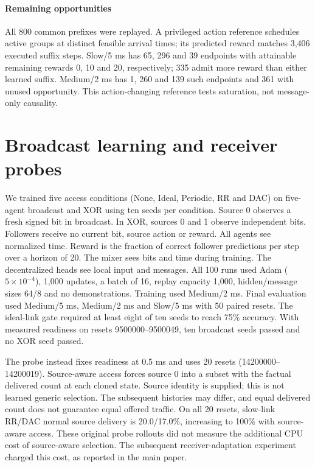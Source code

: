 \documentclass[11pt,a4paper]{article}
\begin{document}
\paragraph{Remaining opportunities}
All 800 common prefixes were replayed. A privileged action reference schedules active groups at distinct feasible arrival times; its predicted reward matches 3,406 executed suffix steps. Slow/5 ms has 65, 296 and 39 endpoints with attainable remaining rewards 0, 10 and 20, respectively; 335 admit more reward than either learned suffix. Medium/2 ms has 1, 260 and 139 such endpoints and 361 with unused opportunity. This action-changing reference tests saturation, not message-only causality.
\FloatBarrier
\section{Broadcast learning and receiver probes}\label{app:probe}
We trained five access conditions (None, Ideal, Periodic, RR and DAC) on five-agent broadcast and XOR using ten seeds per condition. Source 0 observes a fresh signed bit in broadcast. In XOR, sources 0 and 1 observe independent bits. Followers receive no current bit, source action or reward. All agents see normalized time. Reward is the fraction of correct follower predictions per step over a horizon of 20. The mixer sees bits and time during training. The decentralized heads see local input and messages. All 100 runs used Adam ($5\times10^{-4}$), 1,000 updates, a batch of 16, replay capacity 1,000, hidden/message sizes 64/8 and no demonstrations. Training used Medium/2 ms. Final evaluation used Medium/5 ms, Medium/2 ms and Slow/5 ms with 50 paired resets. The ideal-link gate required at least eight of ten seeds to reach 75\% accuracy. With measured readiness on resets 9500000--9500049, ten broadcast seeds passed and no XOR seed passed.

The probe instead fixes readiness at 0.5 ms and uses 20 resets (14200000--14200019). Source-aware access forces source 0 into a subset with the factual delivered count at each cloned state. Source identity is supplied; this is not learned generic selection. The subsequent histories may differ, and equal delivered count does not guarantee equal offered traffic. On all 20 resets, slow-link RR/DAC normal source delivery is 20.0/17.0\%, increasing to 100\% with source-aware access. These original probe rollouts did not measure the additional CPU cost of source-aware selection. The subsequent receiver-adaptation experiment charged this cost, as reported in the main paper.
\end{document}
